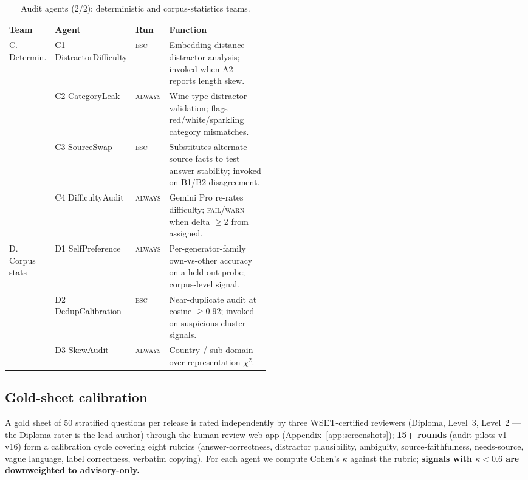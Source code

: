 \begin{table}[h]
  \centering
  \caption{Audit agents (2/2): deterministic and corpus-statistics
    teams.}
  \label{tab:agents-cd}
  \scriptsize
  \setlength{\tabcolsep}{4pt}
  \renewcommand{\arraystretch}{0.95}
  \begin{tabular}{lllp{0.50\linewidth}}
    \toprule
    Team & Agent & Run & Function \\
    \midrule
    \multirow{4}{*}{C. Determin.}
      & C1 DistractorDifficulty  & \textsc{esc}    & Embedding-distance distractor analysis; invoked when A2 reports length skew. \\
      & C2 CategoryLeak          & \textsc{always} & Wine-type distractor validation; flags red/white/sparkling category mismatches. \\
      & C3 SourceSwap            & \textsc{esc}    & Substitutes alternate source facts to test answer stability; invoked on B1/B2 disagreement. \\
      & C4 DifficultyAudit       & \textsc{always} & Gemini Pro re-rates difficulty; \textsc{fail/warn} when delta $\geq$2 from assigned. \\
    \midrule
    \multirow{3}{*}{D. Corpus stats}
      & D1 SelfPreference        & \textsc{always} & Per-generator-family own-vs-other accuracy on a held-out probe; corpus-level signal. \\
      & D2 DedupCalibration      & \textsc{esc}    & Near-duplicate audit at cosine $\geq$0.92; invoked on suspicious cluster signals. \\
      & D3 SkewAudit             & \textsc{always} & Country / sub-domain over-representation $\chi^2$. \\
    \bottomrule
  \end{tabular}
\end{table}

\FloatBarrier
\subsection{Gold-sheet calibration}
\label{sec:gold}
A gold sheet of 50 stratified questions per release is rated independently
by three WSET-certified reviewers (Diploma, Level~3, Level~2 --- the
Diploma rater is the lead author) through the human-review web app
(Appendix~\ref{app:screenshots}); \textbf{15+ rounds} (audit pilots
v1--v16) form a calibration cycle covering eight rubrics
(answer-correctness, distractor plausibility, ambiguity,
source-faithfulness, needs-source, vague language, label correctness,
verbatim copying). For each agent we compute Cohen's $\kappa$ against
the rubric; \textbf{signals with $\kappa<0.6$ are
downweighted to advisory-only.}

